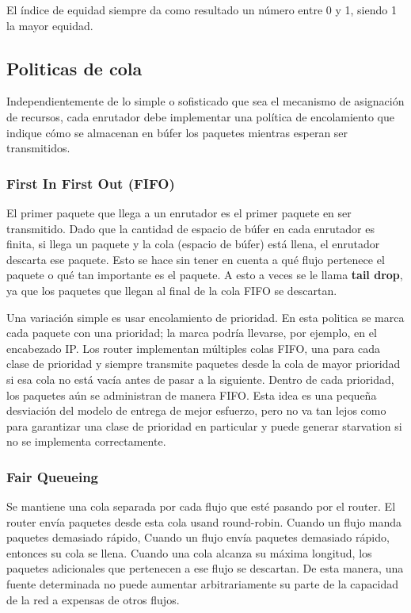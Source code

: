 El índice de equidad siempre da como resultado un número entre 0 y 1, siendo 1 la mayor equidad.

\subsection{Politicas de cola}
Independientemente de lo simple o sofisticado que sea el mecanismo de asignación de recursos, cada enrutador debe implementar una política de encolamiento que indique cómo se almacenan en búfer los paquetes mientras esperan ser transmitidos.

\subsubsection{First In First Out (FIFO)}
El primer paquete que llega a un enrutador es el primer paquete en ser transmitido. Dado que la cantidad de espacio de búfer en cada enrutador es finita, si llega un paquete y la cola (espacio de búfer) está llena, el enrutador descarta ese paquete. Esto se hace sin tener en cuenta a qué flujo pertenece el paquete o qué tan importante es el paquete. A esto a veces se le llama \textbf{tail drop}, ya que los paquetes que llegan al final de la cola FIFO se descartan.

Una variación simple es usar encolamiento de prioridad. En esta politica se marca cada paquete con una prioridad; la marca podría llevarse, por ejemplo, en el encabezado IP. Los router implementan múltiples colas FIFO, una para cada clase de prioridad y siempre transmite paquetes desde la cola de mayor prioridad si esa cola no está vacía antes de pasar a la siguiente. Dentro de cada prioridad, los paquetes aún se administran de manera FIFO. Esta idea es una pequeña desviación del modelo de entrega de mejor esfuerzo, pero no va tan lejos como para garantizar una clase de prioridad en particular y puede generar starvation si no se implementa correctamente.

\subsubsection{Fair Queueing}
Se mantiene una cola separada por cada flujo que esté pasando por el router. El router envía paquetes desde esta cola usand round-robin. Cuando un flujo manda paquetes demasiado rápido, Cuando un flujo envía paquetes demasiado rápido, entonces su cola se llena. Cuando una cola alcanza su máxima longitud, los paquetes adicionales que pertenecen a ese flujo se descartan. De esta manera, una fuente determinada no puede aumentar arbitrariamente su parte de la capacidad de la red a expensas de otros flujos.


